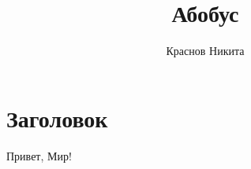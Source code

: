 \documentclass[empty]{mirea}
\title{Абобус}
\author{Краснов Никита}
\begin{document}
	\maketitle
	
	\chapter{Заголовок}
	Привет, Мир!
\end{document}
